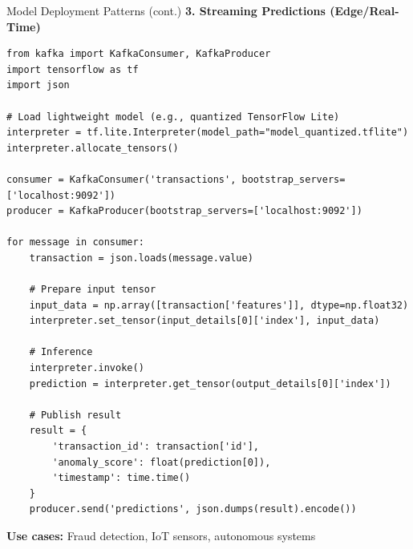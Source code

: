 \begin{frame}[fragile]{Model Deployment Patterns (cont.)}
\textbf{3. Streaming Predictions (Edge/Real-Time)}
\begin{lstlisting}[basicstyle=\ttfamily\tiny]
from kafka import KafkaConsumer, KafkaProducer
import tensorflow as tf
import json

# Load lightweight model (e.g., quantized TensorFlow Lite)
interpreter = tf.lite.Interpreter(model_path="model_quantized.tflite")
interpreter.allocate_tensors()

consumer = KafkaConsumer('transactions', bootstrap_servers=['localhost:9092'])
producer = KafkaProducer(bootstrap_servers=['localhost:9092'])

for message in consumer:
    transaction = json.loads(message.value)

    # Prepare input tensor
    input_data = np.array([transaction['features']], dtype=np.float32)
    interpreter.set_tensor(input_details[0]['index'], input_data)

    # Inference
    interpreter.invoke()
    prediction = interpreter.get_tensor(output_details[0]['index'])

    # Publish result
    result = {
        'transaction_id': transaction['id'],
        'anomaly_score': float(prediction[0]),
        'timestamp': time.time()
    }
    producer.send('predictions', json.dumps(result).encode())
\end{lstlisting}

\textbf{Use cases:} Fraud detection, IoT sensors, autonomous systems
\end{frame}

